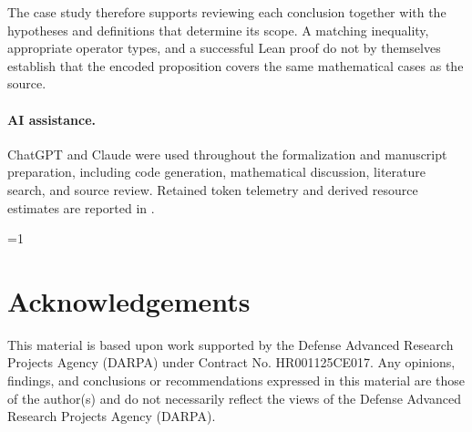 \documentclass{article}
\providecommand{\PublicVersion}{0}
\begin{document}
The case study therefore supports reviewing each conclusion together with the
hypotheses and definitions that determine its scope.  A matching inequality,
appropriate operator types, and a successful Lean proof do not by themselves
establish that the encoded proposition covers the same mathematical cases as
the source.

\paragraph{AI assistance.}
ChatGPT and Claude were used throughout the formalization and manuscript
preparation, including code generation, mathematical discussion, literature
search, and source review. Retained token telemetry and derived resource estimates are
reported in .

\ifnum\PublicVersion=1\relax
\section*{Acknowledgements}
This material is based upon work supported by the Defense Advanced Research
Projects Agency (DARPA) under Contract No. HR001125CE017. Any opinions, findings,
and conclusions or recommendations expressed in this material are those of the
author(s) and do not necessarily reflect the views of the Defense Advanced
Research Projects Agency (DARPA).
\fi

\clearpage
\begingroup
\sloppy


\endgroup

\clearpage
\appendix


\clearpage

\end{document}

